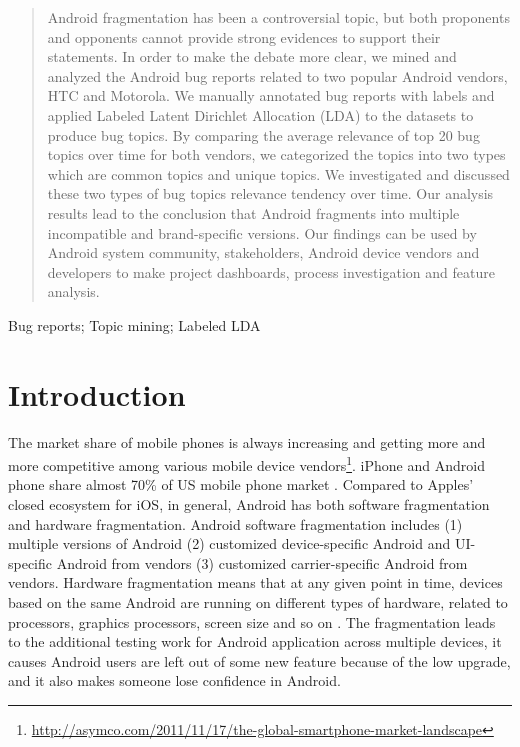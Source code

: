 \documentclass[10pt, conference, compsocconf]{IEEEtran}
\begin{document}
\begin{abstract}
Android fragmentation has been a controversial topic, but both proponents and opponents cannot provide strong evidences to support their statements. In order to make the debate more clear, we mined and analyzed the Android bug reports related to two popular Android vendors, HTC and Motorola. We manually annotated bug reports with labels and applied Labeled Latent Dirichlet Allocation (LDA) to the datasets to produce bug topics. By comparing the average relevance of top 20 bug topics over time for both vendors, we categorized the topics into two types which are common topics and unique topics. We investigated and discussed these two types of bug topics relevance tendency over time. Our analysis results lead to the conclusion that Android fragments into multiple incompatible and brand-specific versions. Our findings can be used by Android system community, stakeholders, Android device vendors and developers to make project dashboards, process investigation and feature analysis.

\end{abstract}

\begin{IEEEkeywords}
Bug reports; Topic mining; Labeled LDA
\end{IEEEkeywords}


%
\IEEEpeerreviewmaketitle



\section{Introduction}

The market share of mobile phones is always increasing and getting more and more competitive among various mobile device vendors\footnote{\url{http://asymco.com/2011/11/17/the-global-smartphone-market-landscape}}. iPhone and Android phone share almost 70\% of US mobile phone market \cite{usmarket}. Compared to Apples' closed ecosystem for iOS, in general, Android has both software fragmentation and hardware fragmentation\cite{analysis}. Android software fragmentation includes (1) multiple versions of Android (2) customized device-specific Android and UI-specific Android from vendors (3) customized carrier-specific Android from vendors. Hardware fragmentation means that at any given point in time, devices based on the same Android are running on different types of hardware, related to processors, graphics processors, screen size and so on \cite{analysis}.  The fragmentation leads to the additional testing work for Android application across multiple devices, it causes Android users are left out of some new feature because of the low upgrade, and it also makes someone lose confidence in Android.  
\end{document}
